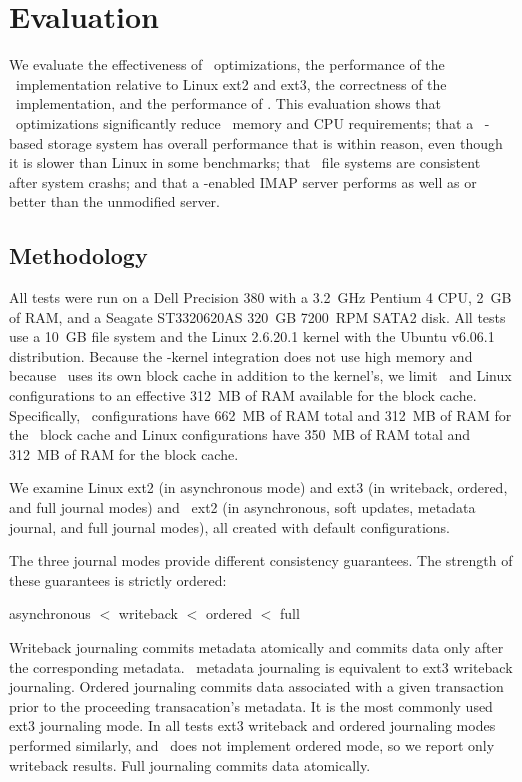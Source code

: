 
\section {Evaluation}
\label{sec:evaluation}

We evaluate
%
the effectiveness of \patch\ optimizations,
%
the performance of the \Kudos\ implementation relative to Linux ext2
and ext3,
%
the correctness of the \Kudos\ implementation,
%
and the performance of \patchgroups.
%
This evaluation shows
%
that \patch\ optimizations significantly reduce \patch\ memory and CPU
requirements;
%
that a \Kudos\ \patch-based storage system has overall performance
that is within reason, even though it is slower than Linux in some
benchmarks;
%
that \Kudos\ file systems are consistent after system crashs;
%
and that a \patchgroup-enabled IMAP server performs as well as or
better than the unmodified server.

\subsection{Methodology}

All tests were run on a Dell Precision 380 with a 3.2~GHz Pentium 4
CPU, 2~GB of RAM, and a Seagate ST3320620AS 320~GB 7200~RPM SATA2 disk.
%
All tests use a 10~GB file system and the Linux 2.6.20.1 kernel
with the Ubuntu v6.06.1 distribution.
%
Because the \Kudos-kernel integration does not use high memory and
because \Kudos\ uses its own block cache in addition to the kernel's,
we limit \Kudos\ and Linux configurations to an effective 312~MB of
RAM available for the block cache.
%
Specifically, \Kudos\ configurations have 662~MB of RAM total and
312~MB of RAM for the \Kudos\ block cache
%
and Linux configurations have 350~MB of RAM total and 312~MB of RAM
for the block cache.

We examine Linux ext2 (in asynchronous mode) and ext3 (in writeback,
ordered, and full journal modes) and \Kudos\ ext2 (in asynchronous,
soft updates, metadata journal, and full journal modes), all created
with default configurations.

The three journal modes provide different consistency guarantees.
The strength of these guarantees is strictly ordered:
\vspace{-0.5\baselineskip}
\begin{center}
asynchronous $<$ writeback $<$ ordered $<$ full
\end{center}
\vspace{-0.5\baselineskip}
Writeback journaling commits metadata atomically and commits data only
after the corresponding metadata. \Kudos\ metadata journaling is
equivalent to ext3 writeback journaling.
%
Ordered journaling commits data associated with a given transaction
prior to the proceeding transacation's metadata. It is the most
commonly used ext3 journaling mode.
%
In all tests ext3 writeback and ordered journaling modes performed
similarly, and \Kudos\ does not implement ordered mode, so we report
only writeback results.
%
Full journaling commits data atomically.

